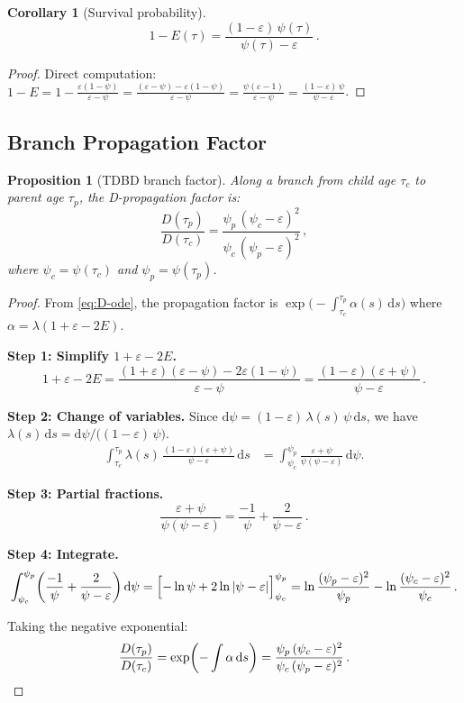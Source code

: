 \documentclass[11pt,a4paper]{article}
\newcommand{\dd}{\mathrm{d}}
\newcommand{\eps}{\varepsilon}
\theoremstyle{plain}
\newtheorem{proposition}{Proposition}
\newtheorem{corollary}{Corollary}
\theoremstyle{definition}
\theoremstyle{remark}
\begin{document}
\begin{corollary}[Survival probability]
\begin{equation}\label{eq:tdbd-surv}
  1 - E(\tau) = \frac{(1 - \eps)\,\psi(\tau)}{\ \psi(\tau) - \eps\ }\,.
\end{equation}
\end{corollary}

\begin{proof}
Direct computation:
$1 - E = 1 - \frac{\eps(1-\psi)}{\eps - \psi}
= \frac{(\eps - \psi) - \eps(1-\psi)}{\eps - \psi}
= \frac{\psi(\eps - 1)}{\eps - \psi}
= \frac{(1-\eps)\,\psi}{\psi - \eps}$.
\end{proof}

\subsection{Branch Propagation Factor}

\begin{proposition}[TDBD branch factor]\label{prop:tdbd-D}
Along a branch from child age $\tau_c$ to parent age $\tau_p$, the D-propagation factor is:
\begin{equation}\label{eq:tdbd-branch}
  \boxed{\frac{D(\tau_p)}{D(\tau_c)}
  = \frac{\psi_p\,(\psi_c - \eps)^2}{\psi_c\,(\psi_p - \eps)^2}}\,,
\end{equation}
where $\psi_c = \psi(\tau_c)$ and $\psi_p = \psi(\tau_p)$.
\end{proposition}

\begin{proof}
From \eqref{eq:D-ode}, the propagation factor is $\exp\!\bigl(-\!\int_{\tau_c}^{\tau_p}\!\alpha(s)\,\dd s\bigr)$ where $\alpha = \lambda(1 + \eps - 2E)$.

\medskip\noindent\textbf{Step 1: Simplify $1 + \eps - 2E$.}
\[
  1 + \eps - 2E = \frac{(1+\eps)(\eps - \psi) - 2\eps(1-\psi)}{\eps - \psi}
  = \frac{(1-\eps)(\eps + \psi)}{\ \psi - \eps\ }\,.
\]

\medskip\noindent\textbf{Step 2: Change of variables.}
Since $\dd\psi = (1-\eps)\,\lambda(s)\,\psi\,\dd s$, we have $\lambda(s)\,\dd s = \dd\psi / \bigl((1-\eps)\,\psi\bigr)$.
\begin{align}
  \int_{\tau_c}^{\tau_p} \lambda(s)\,\frac{(1-\eps)(\eps+\psi)}{\psi - \eps}\,\dd s
  &= \int_{\psi_c}^{\psi_p} \frac{\eps + \psi}{\psi(\psi - \eps)}\,\dd\psi.
\end{align}

\medskip\noindent\textbf{Step 3: Partial fractions.}
\[
  \frac{\eps + \psi}{\psi(\psi - \eps)}
  = \frac{-1}{\psi} + \frac{2}{\psi - \eps}\,.
\]

\medskip\noindent\textbf{Step 4: Integrate.}
\[
  \int_{\psi_c}^{\psi_p} \!\left(\frac{-1}{\psi} + \frac{2}{\psi - \eps}\right)\dd\psi
  = \Bigl[-\ln\psi + 2\ln|\psi - \eps|\Bigr]_{\psi_c}^{\psi_p}
  = \ln\frac{(\psi_p - \eps)^2}{\psi_p} - \ln\frac{(\psi_c - \eps)^2}{\psi_c}\,.
\]

Taking the negative exponential:
\[
  \frac{D(\tau_p)}{D(\tau_c)} = \exp\!\left(-\int\alpha\,\dd s\right)
  = \frac{\psi_p\,(\psi_c - \eps)^2}{\psi_c\,(\psi_p - \eps)^2}\,. \qedhere
\]
\end{proof}
\end{document}
